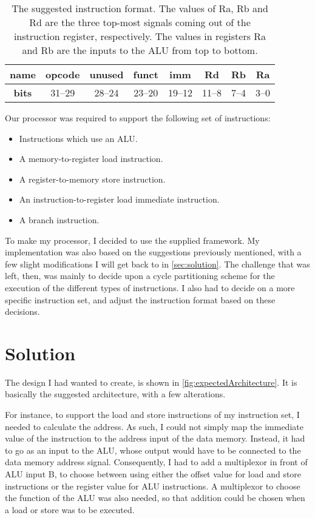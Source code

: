 \documentclass[11pt]{article}
\begin{document}
\begin{table}[htbp]
  \centering
  \begin{tabular}{|c|c|c|c|c|c|c|c|}
    \hline
    {\bf name} & opcode & unused & funct & imm & Rd & Rb & Ra \\ \hline
    {\bf bits} & 31--29 & 28--24 & 23--20 & 19--12 & 11--8 & 7--4 & 3--0 \\ \hline
  \end{tabular}
  \caption{The suggested instruction format. The values of Ra, Rb and Rd are the three top-most signals coming out of the instruction register, respectively. The values in registers Ra and Rb are the inputs to the ALU from top to bottom.}
  \label{tab:suggestedFormat}
\end{table}


Our processor was required to support the following set of instructions:
\begin{itemize}
\item Instructions which use an ALU.
\item A memory-to-register load instruction.
\item A register-to-memory store instruction.
\item An instruction-to-register load immediate instruction.
\item A branch instruction.
\end{itemize}

To make my processor, I decided to use the supplied framework. My
implementation was also based on the suggestions previously mentioned,
with a few slight modifications I will get back to in
\autoref{sec:solution}. The challenge that was left, then, was mainly
to decide upon a cycle partitioning scheme for the execution of the
different types of instructions. I also had to decide on a more
specific instruction set, and adjust the instruction format based on
these decisions.

\section{Solution}
\label{sec:solution}
The design I had wanted to create, is shown in
\autoref{fig:expectedArchitecture}. It is basically the suggested
architecture, with a few alterations. 

For instance, to support the load and store instructions of my
instruction set, I needed to calculate the address. As such, I could
not simply map the immediate value of the instruction to the address
input of the data memory. Instead, it had to go as an input to the
ALU, whose output would have to be connected to the data memory
address signal. Consequently, I had to add a multiplexor in front of
ALU input B, to choose between using either the offset value for load
and store instructions or the register value for ALU instructions. A
multiplexor to choose the function of the ALU was also needed, so that
addition could be chosen when a load or store was to be executed.
\end{document}
